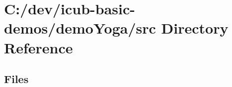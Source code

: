 \section{C\+:/dev/icub-\/basic-\/demos/demo\+Yoga/src Directory Reference}
\label{dir_b27c00042910d6a487ffb0dd3cd42b7b}
\subsection*{Files}
\begin{DoxyCompactItemize}
\end{DoxyCompactItemize}
